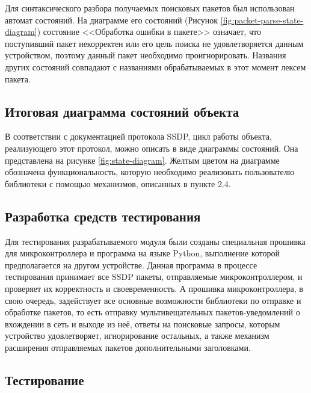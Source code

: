Для синтаксического разбора получаемых поисковых пакетов был использован автомат состояний.
На диаграмме его состояний (Рисунок \ref{fig:packet-parse-state-diagram}) состояние <<Обработка ошибки в пакете>> означает, что поступивший пакет некорректен или его цель поиска не удовлетворяется данным устройством, поэтому данный пакет необходимо проигнорировать.
Названия других состояний совпадают с названиями обрабатываемых в этот момент лексем пакета.


\subsection{Итоговая диаграмма состояний объекта}

В соответствии с документацией протокола SSDP, цикл работы объекта, реализующего этот протокол, можно описать в виде диаграммы состояний.
Она представлена на рисунке \ref{fig:state-diagram}.
Желтым цветом на диаграмме обозначена функциональность, которую необходимо реализовать пользователю библиотеки с помощью механизмов, описанных в пункте 2.4.


\subsection{Разработка средств тестирования}

Для тестирования разрабатываемого модуля были созданы специальная прошивка для микроконтроллера и программа на языке Python, выполнение которой предполагается на другом устройстве.
Данная программа в процессе тестирования принимает все SSDP пакеты, отправляемые микроконтроллером, и проверяет их корректность и своевременность.
А прошивка микроконтроллера, в свою очередь, задействует все основные возможности библиотеки по отправке и обработке пакетов, то есть отправку мультивещательных пакетов-уведомлений о вхождении в сеть и выходе из неё, ответы на поисковые запросы, которым устройство удовлетворяет, игнорирование остальных, а также механизм расширения отправляемых пакетов дополнительными заголовками.

\subsection{Тестирование}

